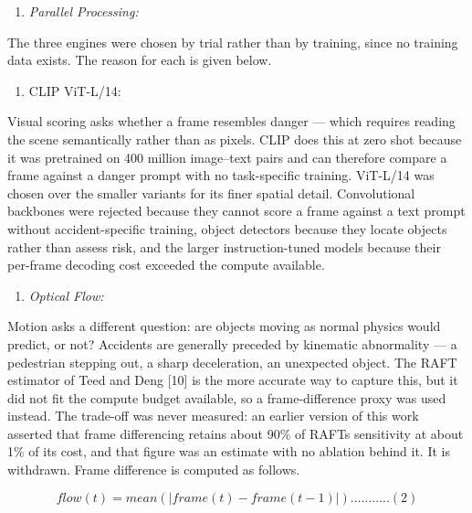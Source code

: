 \begin{enumerate}
\def\labelenumi{\arabic{enumi}.}
\setcounter{enumi}{2}
\item
  \emph{Parallel Processing:}
\end{enumerate}

The three engines were chosen by trial rather than by training, since no training data exists. The reason for each is given below.

\begin{enumerate}
\def\labelenumi{\arabic{enumi}.}
\item
  CLIP ViT-L/14:
\end{enumerate}

Visual scoring asks whether a frame resembles danger --- which requires reading the scene semantically rather than as pixels. CLIP does this at zero shot because it was pretrained on 400 million image--text pairs and can therefore compare a frame against a danger prompt with no task-specific training. ViT-L/14 was chosen over the smaller variants for its finer spatial detail. Convolutional backbones were rejected because they cannot score a frame against a text prompt without accident-specific training, object detectors because they locate objects rather than assess risk, and the larger instruction-tuned models because their per-frame decoding cost exceeded the compute available.

\begin{enumerate}
\def\labelenumi{\arabic{enumi}.}
\setcounter{enumi}{1}
\item
  \emph{Optical Flow:}
\end{enumerate}

Motion asks a different question: are objects moving as normal physics would predict, or not? Accidents are generally preceded by kinematic abnormality --- a pedestrian stepping out, a sharp deceleration, an unexpected object. The RAFT estimator of Teed and Deng {[}10{]} is the more accurate way to capture this, but it did not fit the compute budget available, so a frame-difference proxy was used instead. The trade-off was never measured: an earlier version of this work asserted that frame differencing retains about 90\% of RAFT\textquotesingle s sensitivity at about 1\% of its cost, and that figure was an estimate with no ablation behind it. It is withdrawn. Frame difference is computed as follows.

\[flow(t) = mean\left( \left| frame(t) - frame(t - 1) \right| \right)\ldots\ldots\ldots..(2)\]

